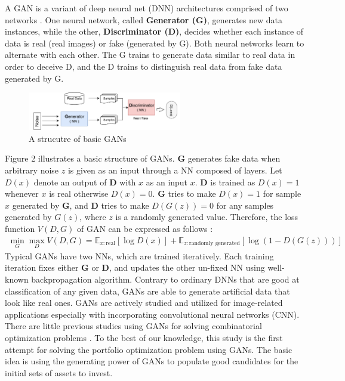 \documentclass[11pt]{article}
\begin{document}
A GAN is a variant of deep neural net (DNN) architectures comprised of two networks \citep{goodfellow2014generative}. One neural network, called \textbf{Generator (G)}, generates new data instances, while the other, \textbf{Discriminator (D)}, decides whether each instance of data is real (real images) or fake (generated by G). Both neural networks learn to alternate with each other. The G trains to generate data similar to real data in order to deceive D, and the D trains to distinguish real data from fake data generated by G. 
\begin{figure}[h] 
	\begin{center}
		\includegraphics[width=0.6\textwidth]{GAN_basic}
		\caption{A strucutre of basic GANs} \label{fig:GAN-basic}
	\end{center}
\end{figure}
Figure 2 illustrates a basic structure of GANs. \textbf{G} generates fake data when arbitrary noise $z$ is given as an input through a NN composed of layers. Let $D(x)$ denote an output of \textbf{D} with $x$ as an input $x$. \textbf{D} is trained as $D(x)=1$ whenever $x$ is real otherwise $D(x)=0$. \textbf{G} tries to make $D(x) = 1$ for sample $x$ generated by \textbf{G}, and \textbf{D} tries to make $D(G(z)) = 0$ for any samples generated by $G(z)$, where $z$ is a randomly generated value. Therefore, the loss function $V(D,G)$ of GAN can be expressed as follows \citep{goodfellow2014generative}:
\begin{align*}
	\min_G \max_D V(D,G)  = \mathbb{E}_{x:\text{real}}\left[\log D(x) \right]  + \mathbb{E}_{z:\text{randomly generated}} \left[\log(1-D(G(z))) \right] 
\end{align*}
Typical GANs have two NNs, which are trained iteratively. Each training iteration fixes either \textbf{G} or \textbf{D}, and updates the other un-fixed NN using well-known backpropagation algorithm. Contrary to ordinary DNNs that are good at classification of any given data, GANs are able to generate artificial data that look like real ones. GANs are actively studied and utilized for image-related applications especially with incorporating convolutional neural networks (CNN). There are little previous studies using GANs for solving combinatorial optimization problems \citep{Anonymous:F_g9Hkad}. To the best of our knowledge, this study is the first attempt for solving the portfolio optimization problem using GANs. The basic idea is using the generating power of GANs to populate good candidates for the initial sets of assets to invest.
 
\end{document}
